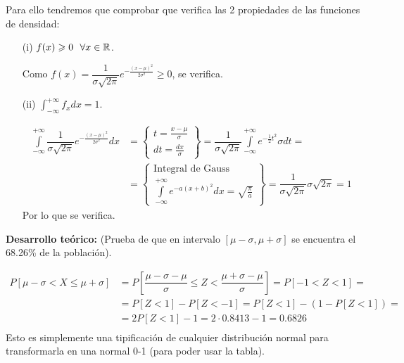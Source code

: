 Para ello tendremos que comprobar que verifica las 2 propiedades de las funciones de densidad:
\begin{enumerate}
    \item[(i)] $f(x)\geqslant0\ \ \forall x \in \mathbb{R}$.
    
    Como $f(x)=\dfrac{1}{\sigma \sqrt{2\pi}} e^{-\frac{(x-\mu)^2}{2\sigma^2}}\geq 0$, se verifica.

    \item[(ii)] $\int_{-\infty}^{+\infty} f_xdx = 1$.
    
    \begin{align*}
        \int\limits_{-\infty}^{+\infty} \dfrac{1}{\sigma \sqrt{2\pi}}e^{-\frac{(x-\mu)^2}{2\sigma^2}}dx &= \left\{
        \begin{array}{c}
            t=\frac{x-\mu}{\sigma}\\
            dt=\frac{dx}{\sigma}
        \end{array}
        \right\} = \dfrac{1}{\sigma \sqrt{2\pi}} \int\limits_{-\infty}^{+\infty}e^{-\frac{1}{2}t^2}\sigma dt =\\&= \left\{
            \begin{array}{c}
                \text{Integral de Gauss}\\
                \int\limits_{-\infty}^{+\infty}e^{-a(x+b)^2}dx = \sqrt{\frac{\pi}{a}}
            \end{array}
            \right\} = \dfrac{1}{\sigma \sqrt{2\pi}}\sigma \sqrt{2\pi}= 1
    \end{align*}
    Por lo que se verifica.
\end{enumerate}

\textbf{Desarrollo teórico:} (Prueba de que en intervalo $[\mu-\sigma, \mu +\sigma]$ se encuentra el 68.26\% de la población).

\begin{align*}
    P[\mu-\sigma < X \leq \mu + \sigma] &= P\left[\dfrac{\mu-\sigma -\mu}{\sigma }\leq Z < \dfrac{\mu+\sigma -\mu}{\sigma }\right] = P[-1<Z<1]=\\
    &=P[Z<1]-P[Z<-1]= P[Z<1]-(1-P[Z<1])=\\
    &=2 P[Z<1]-1 = 2 \cdot 0.8413-1 = 0.6826\\
\end{align*}
Esto es simplemente una tipificación de cualquier distribución normal para transformarla en una normal 0-1 (para poder usar la tabla).